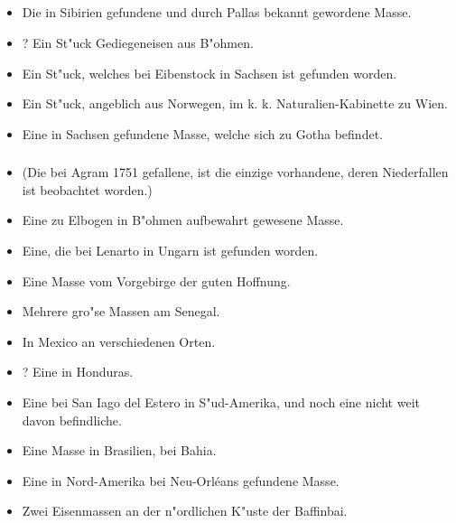 \documentclass[a4paper, 11pt, oneside, polutonikogreek, german]{article}
\begin{document}
\subsection*{}
\subsubsection*{}
\subsubsection*{}
\begin{itemize}
    \item Die in Sibirien gefundene und durch Pallas bekannt gewordene Masse.
    \item ? Ein St"uck Gediegeneisen aus B"ohmen.
    \item Ein St"uck, welches bei Eibenstock in Sachsen ist gefunden worden.
    \item Ein St"uck, angeblich aus Norwegen, im k. k. Naturalien-Kabinette zu Wien.
    \item Eine in Sachsen gefundene Masse, welche sich zu Gotha befindet.
\end{itemize}
\subsubsection*{}
\begin{itemize}
    \item (Die bei Agram 1751 gefallene, ist die einzige vorhandene, deren Niederfallen ist beobachtet worden.)
    \item Eine zu Elbogen in B"ohmen aufbewahrt gewesene Masse.
    \item Eine, die bei Lenarto in Ungarn ist gefunden worden.
    \item Eine Masse vom Vorgebirge der guten Hoffnung.
    \item Mehrere gro"se Massen am Senegal.
    \item In Mexico an verschiedenen Orten.
    \item ? Eine in Honduras.
    \item Eine bei San Iago del Estero in S"ud-Amerika, und noch eine nicht weit davon befindliche.
    \item Eine Masse in Brasilien, bei Bahia.
    \item Eine in Nord-Amerika bei Neu-Orléans gefundene Masse.
    \item Zwei Eisenmassen an der n"ordlichen K"uste der Baffinbai.
\end{itemize}
\end{document}
